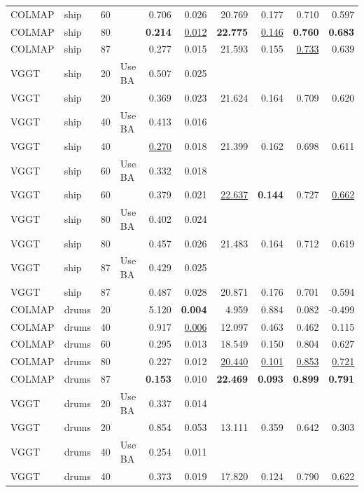 \begin{table}[H]
\begin{tabular}{llrlrrrrrr}
COLMAP & ship & 60 &  & 0.706 & 0.026 & 20.769 & 0.177 & 0.710 & 0.597 \\
COLMAP & ship & 80 &  & \textbf{0.214} & \underline{0.012} & \textbf{22.775} & \underline{0.146} & \textbf{0.760} & \textbf{0.683} \\
COLMAP & ship & 87 &  & 0.277 & 0.015 & 21.593 & 0.155 & \underline{0.733} & 0.639 \\
VGGT & ship & 20 & Use BA & 0.507 & 0.025 &  &  &  &  \\
VGGT & ship & 20 &  & 0.369 & 0.023 & 21.624 & 0.164 & 0.709 & 0.620 \\
VGGT & ship & 40 & Use BA & 0.413 & 0.016 &  &  &  &  \\
VGGT & ship & 40 &  & \underline{0.270} & 0.018 & 21.399 & 0.162 & 0.698 & 0.611 \\
VGGT & ship & 60 & Use BA & 0.332 & 0.018 &  &  &  &  \\
VGGT & ship & 60 &  & 0.379 & 0.021 & \underline{22.637} & \textbf{0.144} & 0.727 & \underline{0.662} \\
VGGT & ship & 80 & Use BA & 0.402 & 0.024 &  &  &  &  \\
VGGT & ship & 80 &  & 0.457 & 0.026 & 21.483 & 0.164 & 0.712 & 0.619 \\
VGGT & ship & 87 & Use BA & 0.429 & 0.025 &  &  &  &  \\
VGGT & ship & 87 &  & 0.487 & 0.028 & 20.871 & 0.176 & 0.701 & 0.594 \\
\midrule
COLMAP & drums & 20 &  & 5.120 & \textbf{0.004} & 4.959 & 0.884 & 0.082 & -0.499 \\
COLMAP & drums & 40 &  & 0.917 & \underline{0.006} & 12.097 & 0.463 & 0.462 & 0.115 \\
COLMAP & drums & 60 &  & 0.295 & 0.013 & 18.549 & 0.150 & 0.804 & 0.627 \\
COLMAP & drums & 80 &  & 0.227 & 0.012 & \underline{20.440} & \underline{0.101} & \underline{0.853} & \underline{0.721} \\
COLMAP & drums & 87 &  & \textbf{0.153} & 0.010 & \textbf{22.469} & \textbf{0.093} & \textbf{0.899} & \textbf{0.791} \\
VGGT & drums & 20 & Use BA & 0.337 & 0.014 &  &  &  &  \\
VGGT & drums & 20 &  & 0.854 & 0.053 & 13.111 & 0.359 & 0.642 & 0.303 \\
VGGT & drums & 40 & Use BA & 0.254 & 0.011 &  &  &  &  \\
VGGT & drums & 40 &  & 0.373 & 0.019 & 17.820 & 0.124 & 0.790 & 0.622 \\

\end{tabular}
\end{table}
